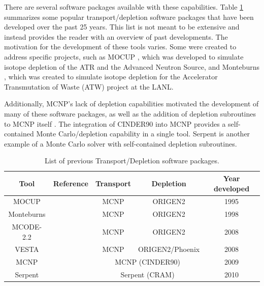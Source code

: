 There are several software packages available with these capabilities.
Table \ref{tab:background} summarizes some popular transport/depletion software packages that have been developed over the past 25 years.
This list is not meant to be extensive and instead provides the reader with an overview of past developments.
The motivation for the development of these tools varies.
Some were created to address specific projects, such as MOCUP \cite{mocup}, which was developed to simulate isotope depletion of the \gls*{ATR} and the Advanced Neutron Source, and Monteburns \cite{monte}, which was created to simulate isotope depletion for the Accelerator Transmutation of Waste (ATW) project at the \gls*{LANL}.

Additionally, MCNP’s lack of depletion capabilities motivated the development of many of these software packages, as well as the addition of depletion subroutines to MCNP itself \cite{mcnp-cinder}.
The integration of CINDER90 into MCNP provides a self-contained Monte Carlo/depletion capability in a single tool.
Serpent \cite{leppanen_serpent_2015} is another example of a Monte Carlo solver with self-contained depletion subroutines.

\begin{table}[htbp!] %
  \centering
  \caption{List of previous Transport/Depletion software packages.}
  \label{tab:background}
  \begin{tabular}{ccccc}
    \toprule
    Tool       & Reference    & Transport  & Depletion  & Year developed \\
    \midrule
    MOCUP      & \cite{mocup} & MCNP       & ORIGEN2    & 1995 \\ %
    Monteburns & \cite{monte} & MCNP       & ORIGEN2    & 1998 \\ %
    MCODE-2.2  & \cite{mcode} & MCNP       & ORIGEN2    & 2008 \\ %
    VESTA      & \cite{vesta} & MCNP       & ORIGEN2/Phoenix & 2008 \\ %
    MCNP       & \cite{mcnp}  & \multicolumn{2}{c}{MCNP (CINDER90)} & 2009 \\ 
    Serpent    & \cite{leppanen_serpent_2015} & \multicolumn{2}{c}{Serpent (CRAM)} & 2010 \\
    \bottomrule
  \end{tabular}
\end{table}

